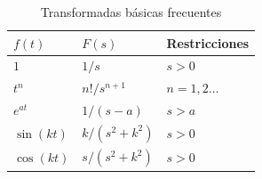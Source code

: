 \documentclass[a4paper,12pt]{article}
\begin{document}
 \begin{table}[h]
 \centering
 \begin{tabular}{@{}lll@{}}
 \toprule
 $f(t)$ & $F(s)$ & Restricciones \\ \midrule
 $1$ & $1/s$ & $s > 0$ \\
 $t^n$ & $n!/s^{n+1}$ & $n=1,2 \dots$ \\
 $e^{at}$ & $1/(s-a)$ & $s > a$ \\
 $\sin(kt)$ & $k/(s^2+k^2)$ & $s > 0$ \\
 $\cos(kt)$ & $s/(s^2+k^2)$ & $s > 0$ \\ \bottomrule
 \end{tabular}
 \caption{Transformadas básicas frecuentes}
 \end{table}

 
\end{document}
